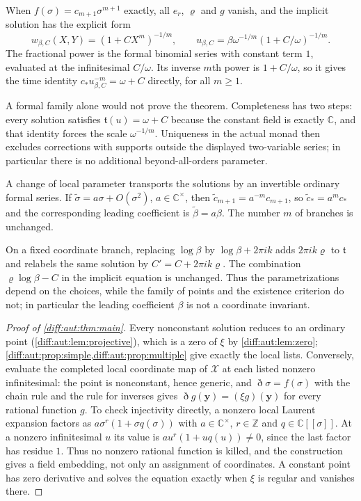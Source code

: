 \documentclass[11pt,letterpaper]{article}
\numberwithin{equation}{section}
\theoremstyle{definition}
\theoremstyle{remark}
\newcommand{\C}{\mathbb C}
\newcommand{\Z}{\mathbb Z}
\newcommand{\Dn}{\eth}
\begin{document}
When $f(\sigma)=c_{m+1}\sigma^{m+1}$ exactly, all $e_r$, $\varrho$
and $g$ vanish, and the implicit solution has the explicit form
\[
 w_{\beta,C}(X,Y)=(1+CX^m)^{-1/m},\qquad
 u_{\beta,C}=\beta\omega^{-1/m}(1+C/\omega)^{-1/m}.
\]
The fractional power is the formal binomial series with constant
term $1$, evaluated at the infinitesimal $C/\omega$. Its inverse
$m$th power is $1+C/\omega$, so it gives the time identity
$c_*u_{\beta,C}^{-m}=\omega+C$ directly, for all $m\geq1$.

\begin{remark}
\label{diff:aut:rem:nohidden}
A formal family alone would not prove the theorem. Completeness has two steps:
every solution satisfies $\mathfrak t(u)=\omega+C$ because the constant field is
exactly $\C$, and that identity forces the scale $\omega^{-1/m}$. Uniqueness in
the actual monad then excludes corrections with supports outside the displayed
two-variable series; in particular there is no additional beyond-all-orders
parameter.
\end{remark}

\begin{remark}
\label{diff:aut:rem:choices}
A change of local parameter transports the solutions by an invertible
ordinary formal series. If
$\widetilde\sigma=a\sigma+O(\sigma^2)$, $a\in\C^\times$, then
$\widetilde c_{m+1}=a^{-m}c_{m+1}$, so
$\widetilde c_*=a^mc_*$ and the corresponding leading coefficient is
$\widetilde\beta=a\beta$. The number $m$ of branches is unchanged.

On a fixed coordinate branch, replacing $\log\beta$ by
$\log\beta+2\pi i k$ adds $2\pi i k\varrho$ to $\mathfrak t$ and
relabels the same solution by $C'=C+2\pi i k\varrho$.
The combination $\varrho\log\beta-C$ in the implicit equation is
unchanged. Thus the parametrizations depend on the choices, while
the family of points and the existence criterion do not; in
particular the leading coefficient $\beta$ is not a coordinate
invariant.
\end{remark}

\begin{proof}[Proof of \cref{diff:aut:thm:main}]
Every nonconstant solution reduces to an ordinary point
(\cref{diff:aut:lem:projective}), which is a zero of $\xi$ by
\cref{diff:aut:lem:zero}; \cref{diff:aut:prop:simple,diff:aut:prop:multiple} give
exactly the local lists. Conversely, evaluate the completed local coordinate map
of $\mathcal X$ at each listed nonzero infinitesimal: the point is nonconstant,
hence generic, and $\Dn\sigma=f(\sigma)$ with the chain rule and the rule for
inverses gives $\Dn g(\mathbf y)=(\xi g)(\mathbf y)$ for every rational function
$g$. To check injectivity directly, a nonzero local Laurent
expansion factors as $a\sigma^r(1+\sigma q(\sigma))$ with
$a\in\C^\times$, $r\in\Z$ and $q\in\C[[\sigma]]$.
At a nonzero infinitesimal $u$ its value is
$au^r(1+u q(u))\neq0$, since the last factor has residue $1$.
Thus no nonzero rational function is killed, and the construction
gives a field embedding, not only an assignment of coordinates. A constant point has zero derivative and solves the equation
exactly when $\xi$ is regular and vanishes there.
\end{proof}
\end{document}
